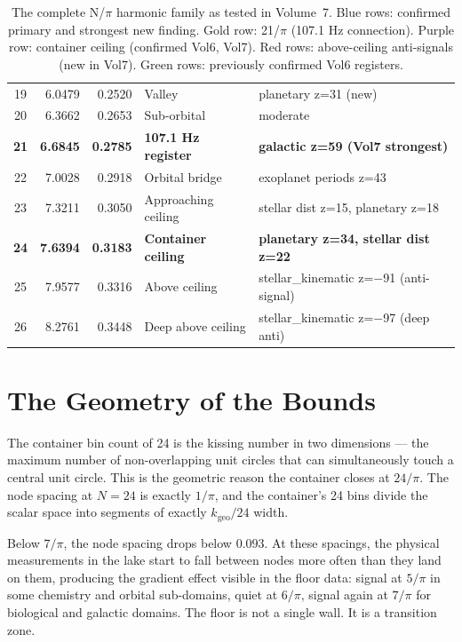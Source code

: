 \documentclass[11pt, letterpaper, openany]{book}
\begin{document}
\begin{table}[H]
\begin{tabular}{|c|r|r|l|l|}
19 & 6.0479 & 0.2520 & Valley           & planetary z=31 (new) \\
20 & 6.3662 & 0.2653 & Sub-orbital       & moderate \\
\rowcolor{goldseal!15}
\textbf{21} & \textbf{6.6845} & \textbf{0.2785} & \textbf{107.1 Hz register} & \textbf{galactic z=59 (Vol7 strongest)} \\
\rowcolor{signalgreen!10}
22 & 7.0028 & 0.2918 & Orbital bridge    & exoplanet periods z=43 \\
23 & 7.3211 & 0.3050 & Approaching ceiling & stellar dist z=15, planetary z=18 \\
\rowcolor{ceilpurple!15}
\textbf{24} & \textbf{7.6394} & \textbf{0.3183} & \textbf{Container ceiling} & \textbf{planetary z=34, stellar dist z=22} \\
\rowcolor{signalred!10}
25 & 7.9577 & 0.3316 & Above ceiling    & stellar\_kinematic z=$-$91 (anti-signal) \\
\rowcolor{signalred!10}
26 & 8.2761 & 0.3448 & Deep above ceiling & stellar\_kinematic z=$-$97 (deep anti) \\
\hline
\end{tabular}
\caption{The complete N/$\pi$ harmonic family as tested in Volume~7.
Blue rows: confirmed primary and strongest new finding.
Gold row: 21/$\pi$ (107.1 Hz connection).
Purple row: container ceiling (confirmed Vol6, Vol7).
Red rows: above-ceiling anti-signals (new in Vol7).
Green rows: previously confirmed Vol6 registers.}
\label{tab:v7_complete_family}
\end{table}

\section*{The Geometry of the Bounds}

The container bin count of 24 is the kissing number in two dimensions --- the maximum
number of non-overlapping unit circles that can simultaneously touch a central unit
circle. This is the geometric reason the container closes at $24/\pi$. The node spacing
at $N = 24$ is exactly $1/\pi$, and the container's 24 bins divide the scalar space into
segments of exactly $k_\text{geo}/24$ width.

Below $7/\pi$, the node spacing drops below $0.093$. At these spacings, the physical
measurements in the lake start to fall between nodes more often than they land on them,
producing the gradient effect visible in the floor data: signal at $5/\pi$ in some
chemistry and orbital sub-domains, quiet at $6/\pi$, signal again at $7/\pi$ for
biological and galactic domains. The floor is not a single wall. It is a transition zone.
\end{document}
